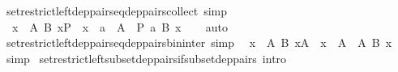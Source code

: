 \begin{isabellebody}
\isamarkupfalse%
\ set{\isacharunderscore}{\kern0pt}restrict{\isacharunderscore}{\kern0pt}left{\isacharunderscore}{\kern0pt}dep{\isacharunderscore}{\kern0pt}pairs{\isacharunderscore}{\kern0pt}eq{\isacharunderscore}{\kern0pt}dep{\isacharunderscore}{\kern0pt}pairs{\isacharunderscore}{\kern0pt}collect\ {\isacharbrackleft}{\kern0pt}simp{\isacharbrackright}{\kern0pt}{\isacharcolon}{\kern0pt}\isanewline
\ \ {\isachardoublequoteopen}{\isacharparenleft}{\kern0pt}{\isasymSum}x\ {\isasymin}\ A{\isachardot}{\kern0pt}\ B\ x{\isacharparenright}{\kern0pt}{\isasymrestriction}\isactrlbsub P\isactrlesub \ {\isacharequal}{\kern0pt}\ {\isacharparenleft}{\kern0pt}{\isasymSum}x\ {\isasymin}\ {\isacharbraceleft}{\kern0pt}a\ {\isasymin}\ A\ {\isacharbar}{\kern0pt}\ P\ a{\isacharbraceright}{\kern0pt}{\isachardot}{\kern0pt}\ B\ x{\isacharparenright}{\kern0pt}{\isachardoublequoteclose}\isanewline
%
\isadelimproof
\ \ %
\endisadelimproof
%
\isatagproof
{}\isamarkupfalse%
\ auto%
\endisatagproof
{\isafoldproof}%
%
\isadelimproof
\isanewline
%
\endisadelimproof
\isanewline
{}\isamarkupfalse%
\ set{\isacharunderscore}{\kern0pt}restrict{\isacharunderscore}{\kern0pt}left{\isacharunderscore}{\kern0pt}dep{\isacharunderscore}{\kern0pt}pairs{\isacharunderscore}{\kern0pt}eq{\isacharunderscore}{\kern0pt}dep{\isacharunderscore}{\kern0pt}pairs{\isacharunderscore}{\kern0pt}bin{\isacharunderscore}{\kern0pt}inter\ {\isacharbrackleft}{\kern0pt}simp{\isacharbrackright}{\kern0pt}{\isacharcolon}{\kern0pt}\isanewline
\ \ {\isachardoublequoteopen}{\isacharparenleft}{\kern0pt}{\isasymSum}x\ {\isasymin}\ A{\isachardot}{\kern0pt}\ B\ x{\isacharparenright}{\kern0pt}{\isasymrestriction}\isactrlbsub A{\isacharprime}{\kern0pt}\isactrlesub \ {\isacharequal}{\kern0pt}\ {\isacharparenleft}{\kern0pt}{\isasymSum}x\ {\isasymin}\ A\ {\isasyminter}\ A{\isacharprime}{\kern0pt}{\isachardot}{\kern0pt}\ B\ x{\isacharparenright}{\kern0pt}{\isachardoublequoteclose}\isanewline
%
\isadelimproof
\ \ %
\endisadelimproof
%
\isatagproof
{}\isamarkupfalse%
\ simp%
\endisatagproof
{\isafoldproof}%
%
\isadelimproof
\isanewline
%
\endisadelimproof
\isanewline
{}\isamarkupfalse%
\ set{\isacharunderscore}{\kern0pt}restrict{\isacharunderscore}{\kern0pt}left{\isacharunderscore}{\kern0pt}subset{\isacharunderscore}{\kern0pt}dep{\isacharunderscore}{\kern0pt}pairs{\isacharunderscore}{\kern0pt}if{\isacharunderscore}{\kern0pt}subset{\isacharunderscore}{\kern0pt}dep{\isacharunderscore}{\kern0pt}pairs\ {\isacharbrackleft}{\kern0pt}intro{\isacharbrackright}{\kern0pt}{\isacharcolon}{\kern0pt}\isanewline

\end{isabellebody}
